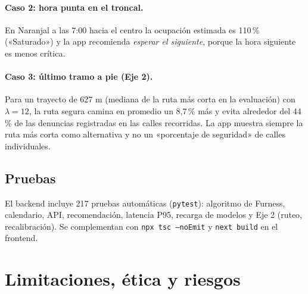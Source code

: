 \documentclass[11pt]{article}
\newcommand{\code}[1]{\texttt{#1}}
\begin{document}
\paragraph{Caso 2: hora punta en el troncal.} En Naranjal a las 7:00 hacia el centro la ocupación
estimada es 110\,\% («Saturado») y la app recomienda \emph{esperar el siguiente}, porque la hora
siguiente es menos crítica.

\paragraph{Caso 3: último tramo a pie (Eje 2).} Para un trayecto de 627 m (mediana de la ruta más
corta en la evaluación) con $\lambda=12$, la ruta segura camina en promedio un 8,7\,\% más y evita
alrededor del 44\,\% de las denuncias registradas en las calles recorridas. La app muestra siempre la
ruta más corta como alternativa y no un «porcentaje de seguridad» de calles individuales.

\subsection{Pruebas}
El backend incluye 217 pruebas automáticas (\code{pytest}): algoritmo de Furness, calendario,
API, recomendación, latencia P95, recarga de modelos y Eje 2 (ruteo, recalibración). Se complementan
con \code{npx tsc --noEmit} y \code{next build} en el frontend.

\section{Limitaciones, ética y riesgos}
\label{sec:limit}
\end{document}
